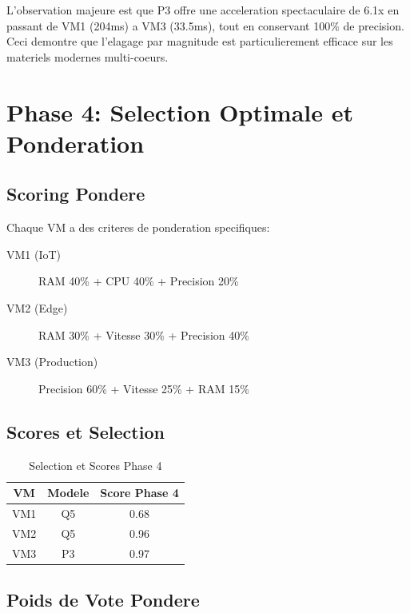 \documentclass[12pt,a4paper]{report}
\begin{document}
L'observation majeure est que P3 offre une acceleration spectaculaire de 6.1x en passant de VM1 (204ms) a VM3 (33.5ms), tout en conservant 100\% de precision. Ceci demontre que l'elagage par magnitude est particulierement efficace sur les materiels modernes multi-coeurs.

\chapter{Phase 4: Selection Optimale et Ponderation}

\section{Scoring Pondere}

Chaque VM a des criteres de ponderation specifiques:

\begin{description}
    \item[VM1 (IoT)] RAM 40\% + CPU 40\% + Precision 20\%
    \item[VM2 (Edge)] RAM 30\% + Vitesse 30\% + Precision 40\%
    \item[VM3 (Production)] Precision 60\% + Vitesse 25\% + RAM 15\%
\end{description}

\section{Scores et Selection}

\begin{table}[H]
\centering
\begin{tabular}{|c|c|c|}
\hline
\textbf{VM} & \textbf{Modele} & \textbf{Score Phase 4} \\
\hline
\cellcolor{lightblue} VM1 & \cellcolor{lightblue} Q5 & \cellcolor{lightblue} 0.68 \\
\cellcolor{lightblue} VM2 & \cellcolor{lightblue} Q5 & \cellcolor{lightblue} 0.96 \\
\cellcolor{lightblue} VM3 & \cellcolor{lightblue} P3 & \cellcolor{lightblue} 0.97 \\
\hline
\end{tabular}
\caption{Selection et Scores Phase 4}
\end{table}

\section{Poids de Vote Pondere}
\end{document}
